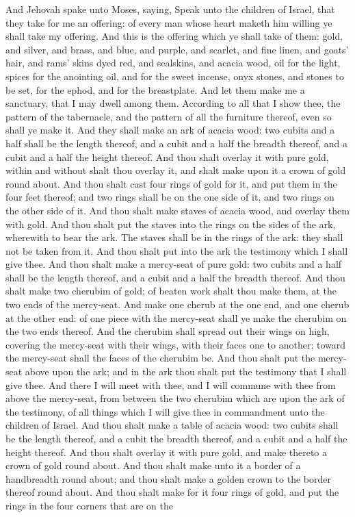 And Jehovah spake unto Moses, saying, Speak unto the children of Israel, that they take for me an offering: of every man whose heart maketh him willing ye shall take my offering. And this is the offering which ye shall take of them: gold, and silver, and brass, and blue, and purple, and scarlet, and fine linen, and goats’ hair, and rams’ skins dyed red, and sealskins, and acacia wood, oil for the light, spices for the anointing oil, and for the sweet incense, onyx stones, and stones to be set, for the ephod, and for the breastplate. And let them make me a sanctuary, that I may dwell among them. According to all that I show thee, the pattern of the tabernacle, and the pattern of all the furniture thereof, even so shall ye make it.  And they shall make an ark of acacia wood: two cubits and a half shall be the length thereof, and a cubit and a half the breadth thereof, and a cubit and a half the height thereof. And thou shalt overlay it with pure gold, within and without shalt thou overlay it, and shalt make upon it a crown of gold round about. And thou shalt cast four rings of gold for it, and put them in the four feet thereof; and two rings shall be on the one side of it, and two rings on the other side of it. And thou shalt make staves of acacia wood, and overlay them with gold. And thou shalt put the staves into the rings on the sides of the ark, wherewith to bear the ark. The staves shall be in the rings of the ark: they shall not be taken from it. And thou shalt put into the ark the testimony which I shall give thee. And thou shalt make a mercy-seat of pure gold: two cubits and a half shall be the length thereof, and a cubit and a half the breadth thereof. And thou shalt make two cherubim of gold; of beaten work shalt thou make them, at the two ends of the mercy-seat. And make one cherub at the one end, and one cherub at the other end: of one piece with the mercy-seat shall ye make the cherubim on the two ends thereof. And the cherubim shall spread out their wings on high, covering the mercy-seat with their wings, with their faces one to another; toward the mercy-seat shall the faces of the cherubim be. And thou shalt put the mercy-seat above upon the ark; and in the ark thou shalt put the testimony that I shall give thee. And there I will meet with thee, and I will commune with thee from above the mercy-seat, from between the two cherubim which are upon the ark of the testimony, of all things which I will give thee in commandment unto the children of Israel.  And thou shalt make a table of acacia wood: two cubits shall be the length thereof, and a cubit the breadth thereof, and a cubit and a half the height thereof. And thou shalt overlay it with pure gold, and make thereto a crown of gold round about. And thou shalt make unto it a border of a handbreadth round about; and thou shalt make a golden crown to the border thereof round about. And thou shalt make for it four rings of gold, and put the rings in the four corners that are on the 